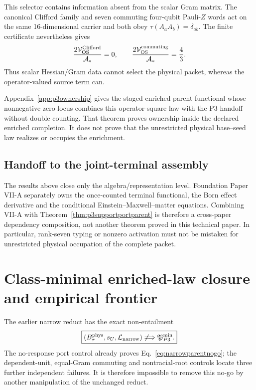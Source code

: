 This selector contains information absent from the scalar Gram matrix.  The
canonical Clifford family and seven commuting four-qubit Pauli-$Z$ words act
on the same 16-dimensional carrier and both obey
$\tau(A_aA_b)=\delta_{ab}$.  The finite certificate nevertheless gives
\begin{equation}
 \frac{2\mathcal V_{\rm OS}^{\rm Clifford}}{\mathcal A_*}=0,
 \qquad
 \frac{2\mathcal V_{\rm OS}^{\rm commuting}}{\mathcal A_*}=\frac{4}{3}.
 \label{eq:p3operatorsquarecontrol}
\end{equation}
Thus scalar Hessian/Gram data cannot select the physical packet, whereas the
operator-valued source term can.

Appendix~\ref{app:p3ownership} gives the staged enriched-parent functional
whose nonnegative zero locus combines this operator-square law with the P3
handoff without double counting.  That theorem proves ownership inside the
declared enriched completion.  It does not prove that the unrestricted
physical base--seed law realizes or occupies the enrichment.

\subsection{Handoff to the joint-terminal assembly}

The results above close only the algebra/representation level. Foundation
Paper VII-A separately owns the once-counted terminal functional, the Born
effect derivative and the conditional Einstein--Maxwell--matter equations.
Combining VII-A with Theorem~\ref{thm:p3supportportparent} is therefore a
cross-paper dependency composition, not another theorem proved in this
technical paper. In particular, rank-seven typing or nonzero activation must
not be mistaken for unrestricted physical occupation of the complete packet.


\section{Class-minimal enriched-law closure and empirical frontier}
\label{sec:selectionfrontier}

The earlier narrow reduct has the exact non-entailment
\begin{equation}
 \boxed{
 (B_\tau^{\rm phys},s_U,\mathcal L_{\rm narrow})
 \not\Longrightarrow
 \mathfrak P_{P3}^{\min}.
 }
 \label{eq:narrowparentnogo}
\end{equation}
The no-response port control already proves Eq.~\eqref{eq:narrowparentnogo};
the dependent-unit, equal-Gram commuting and nontracial-root controls locate
three further independent failures.  It is therefore impossible to remove
this no-go by another manipulation of the unchanged reduct.

